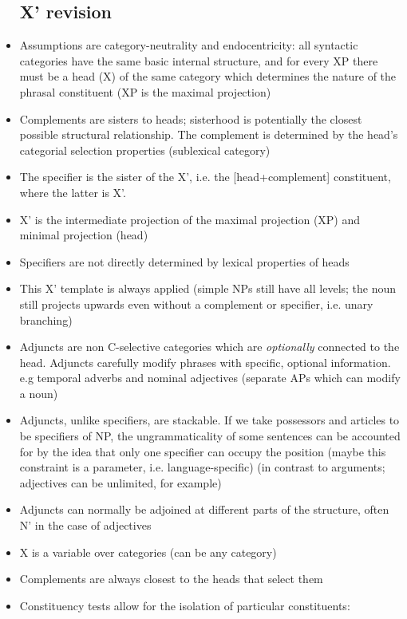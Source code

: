 \documentclass{article}
\begin{document}
\begin{itemize}
    \subsection{X' revision}
    \item Assumptions are category-neutrality and endocentricity: all syntactic categories have the same basic internal structure, and for every XP there must be a head (X) of the same category which determines the nature of the phrasal constituent (XP is the maximal projection)
    \item Complements are sisters to heads; sisterhood is potentially the closest possible structural relationship. The complement is determined by the head's categorial selection properties (sublexical category)
    \item The specifier is the sister of the X', i.e. the [head+complement] constituent, where the latter is X'.
    \item X' is the intermediate projection of the maximal projection (XP) and minimal projection (head)
    \item Specifiers are not directly determined by lexical properties of heads
    \item This X' template is always applied (simple NPs still have all levels; the noun still projects upwards even without a complement or specifier, i.e. unary branching)
    \item Adjuncts are non C-selective categories which are \textit{optionally} connected to the head. Adjuncts carefully modify phrases with specific, optional information. e.g temporal adverbs and nominal adjectives (separate APs which can modify a noun)  
    \item Adjuncts, unlike specifiers, are stackable. If we take possessors and articles to be specifiers of NP, the ungrammaticality of some sentences can be accounted for by the idea that only one specifier can occupy the position (maybe this constraint is a parameter, i.e. language-specific) (in contrast to arguments; adjectives can be unlimited, for example)
    \item Adjuncts can normally be adjoined at different parts of the structure, often N' in the case of adjectives
    \item X is a variable over categories (can be any category)
    \item Complements are always closest to the heads that select them
    \item Constituency tests allow for the isolation of particular constituents:
    \begin{itemize}

\end{itemize}
\end{itemize}
\end{document}
